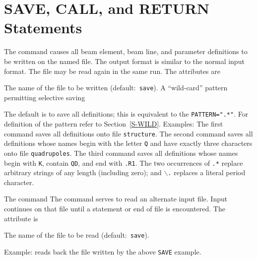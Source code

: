 \section{SAVE, CALL, and RETURN Statements}
\label{S-IMBED}
The  command
causes all beam element, beam line, and parameter definitions
to be written on the named file.
The output format is similar to the normal input format.
The file may be read again in the same run.
The attributes are
\begin{mylist}
The name of the file to be written (default:~{\tt save}).
A ``wild-card'' pattern permitting selective saving
\end{mylist}
The default is to save all definitions;
this is equivalent to the {\tt PATTERN=".*"}.
For definition of the pattern refer to Section~\ref{S-WILD}.
Examples:
The first command saves all definitions onto file {\tt structure}.
The second command saves all definitions
whose names begin with the letter {\tt Q} and have exactly three
characters onto file {\tt quadrupoles}.
The third command saves all definitions whose names begin with {\tt K},
contain {\tt QD}, and end with {\tt .R1}.
The two occurrences of {\tt .*} replace arbitrary strings of any length
(including zero);
and {\tt \(\backslash\).} replaces a literal period character.
 
The command
The  command
serves to read an alternate input file.
Input continues on that file until a  statement
or end of file is encountered.
The attribute is
\begin{mylist}
The name of the file to be read (default:~{\tt save}).
\end{mylist}
Example:
reads back the file written by the above {\tt SAVE} example.

